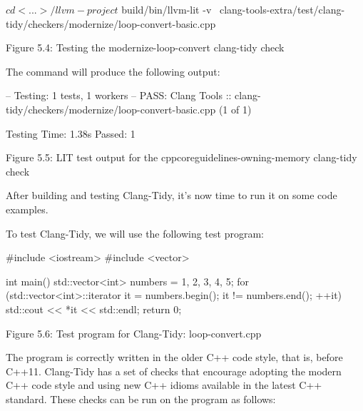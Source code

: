 \begin{shell}
$ cd <...>/llvm-project
$ build/bin/llvm-lit -v \
    clang-tools-extra/test/clang-tidy/checkers/modernize/loop-convert-basic.cpp
\end{shell}

\begin{center}
Figure 5.4: Testing the modernize-loop-convert clang-tidy check
\end{center}

The command will produce the following output:

\begin{shell}
-- Testing: 1 tests, 1 workers --
PASS: Clang Tools :: clang-tidy/checkers/modernize/loop-convert-basic.cpp
(1 of 1)

Testing Time: 1.38s
  Passed: 1
\end{shell}

\begin{center}
Figure 5.5: LIT test output for the cppcoreguidelines-owning-memory clang-tidy check
\end{center}

After building and testing Clang-Tidy, it's now time to run it on some code examples.



To test Clang-Tidy, we will use the following test program:

\begin{cpp}
#include <iostream>
#include <vector>

int main() {
  std::vector<int> numbers = {1, 2, 3, 4, 5};
  for (std::vector<int>::iterator it = numbers.begin(); it != numbers.end();
    ++it) {
    std::cout << *it << std::endl;
  }
  return 0;
}
\end{cpp}

\begin{center}
Figure 5.6: Test program for Clang-Tidy: loop-convert.cpp
\end{center}

The program is correctly written in the older C++ code style, that is, before C++11. Clang-Tidy has a set of checks that encourage adopting the modern C++ code style and using new C++ idioms available in the latest C++ standard. These checks can be run on the program as follows:


